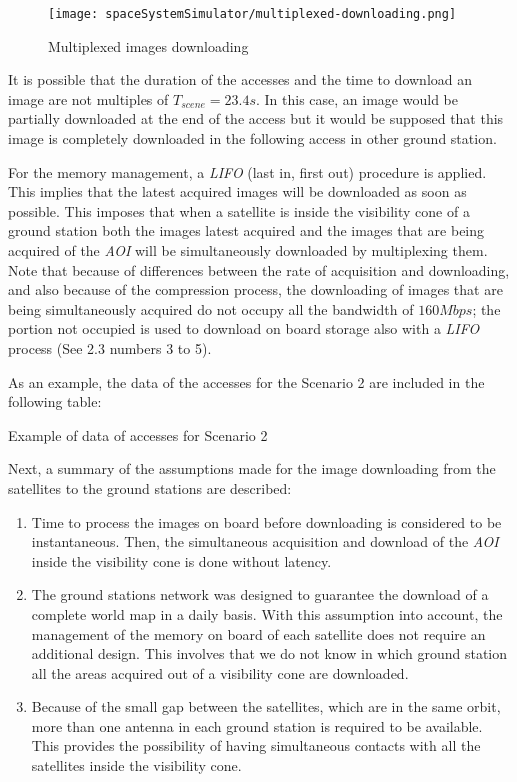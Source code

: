 \begin{figure}[!h]
\begin{center}
\texttt{[image: spaceSystemSimulator/multiplexed-downloading.png]}
\caption{Multiplexed images downloading}
\label{fig:sss-multiplexed-downloading}
\end{center}
\end{figure}



It is possible that the duration of the accesses and the time to download an image are not multiples of $T_{scene}=23.4s$. In this case, an image would be partially downloaded at the end of the access but it would be supposed that this image is completely downloaded in the following access in other ground station.

For the memory management, a \emph{LIFO} (last in, first out) procedure is
applied. This implies that the latest acquired images will be downloaded as soon
as possible. This imposes that when a satellite is inside the visibility cone of
a ground station both the images latest acquired and the images that are being
acquired of the \emph{AOI} will be simultaneously downloaded by multiplexing
them. Note that because of differences between the rate of acquisition and
downloading, and also because of the compression process, the downloading of
images that are being simultaneously acquired do not occupy all the bandwidth of
$160Mbps$; the portion not occupied is used to download on board storage also
with a \emph{LIFO} process (See 2.3 numbers 3 to 5).


As an example, the data of the accesses for the Scenario 2 are included in the
following table:


\begin{table}[hp]
  \centering
  {\small
  
  }
  \caption{Example of data of accesses for Scenario 2}
  \label{table:sss-accesses-scenario2}
\end{table}


Next, a summary of the assumptions made for the image downloading from the
satellites to the ground stations are described:
\begin{enumerate}
\item Time to process the images on board before downloading is considered to be instantaneous. Then, the simultaneous acquisition and download of the \emph{AOI} inside the visibility cone is done without latency.
\item The ground stations network was designed to guarantee the download of a complete world map in a daily basis. With this assumption into account, the management of the memory on board of each satellite does not require an additional design. This involves that we do not know in which ground station all the areas acquired out of a visibility cone are downloaded.
\item Because of the small gap between the satellites, which are in the same orbit, more than one antenna in each ground station is required to be available. This provides the possibility of having simultaneous contacts with all the satellites inside the visibility cone.
\end{enumerate}

